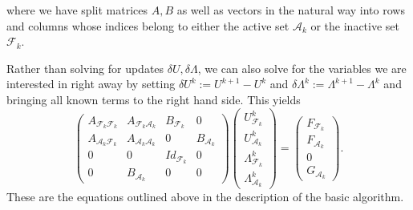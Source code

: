 \documentclass{article}
\begin{document}
where we have split matrices $A,B$ as well as vectors in the natural way into
rows and columns whose indices belong to either the active set
${\mathcal{A}_k}$ or the inactive set ${\mathcal{F}_k}$.

Rather than solving for updates $\delta U, \delta \Lambda$, we can also solve
for the variables we are interested in right away by setting $\delta U^k :=
U^{k+1} - U^k$ and $\delta \Lambda^k := \Lambda^{k+1} - \Lambda^k$ and
bringing all known terms to the right hand side. This yields
\begin{equation*}
\begin{pmatrix}
 A_{\mathcal{F}_k\mathcal{F}_k} & A_{\mathcal{F}_k\mathcal{A}_k} & B_{\mathcal{F}_k} & 0\\
 A_{\mathcal{A}_k\mathcal{F}_k} & A_{\mathcal{A}_k\mathcal{A}_k} & 0 & B_{\mathcal{A}_k}\\
 0 & 0 & Id_{\mathcal{F}_k} & 0\\
 0 & B_{\mathcal{A}_k} & 0 & 0
\end{pmatrix}
\begin{pmatrix}
 U^k_{\mathcal{F}_k}\\ U^k_{\mathcal{A}_k}\\ \Lambda^k_{\mathcal{F}_k}\\ \Lambda^k_{\mathcal{A}_k}
\end{pmatrix}
=
\begin{pmatrix}
 F_{\mathcal{F}_k}\\ F_{\mathcal{A}_k}\\ 0\\ G_{\mathcal{A}_k}
\end{pmatrix}.
\end{equation*}
These are the equations outlined above in the description of the basic algorithm.
\end{document}
